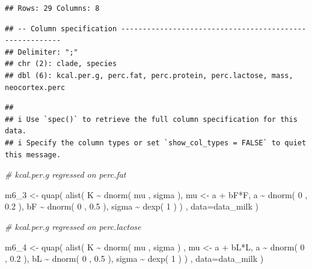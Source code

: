 \documentclass[
]{book}
\newenvironment{Shaded}{\begin{snugshade}}{\end{snugshade}}
\newcommand{\AttributeTok}[1]{\textcolor[rgb]{0.77,0.63,0.00}{#1}}
\newcommand{\CommentTok}[1]{\textcolor[rgb]{0.56,0.35,0.01}{\textit{#1}}}
\newcommand{\DecValTok}[1]{\textcolor[rgb]{0.00,0.00,0.81}{#1}}
\newcommand{\FloatTok}[1]{\textcolor[rgb]{0.00,0.00,0.81}{#1}}
\newcommand{\FunctionTok}[1]{\textcolor[rgb]{0.00,0.00,0.00}{#1}}
\newcommand{\NormalTok}[1]{#1}
\newcommand{\OtherTok}[1]{\textcolor[rgb]{0.56,0.35,0.01}{#1}}
\newcommand{\SpecialCharTok}[1]{\textcolor[rgb]{0.00,0.00,0.00}{#1}}
\begin{document}
\begin{verbatim}
## Rows: 29 Columns: 8
\end{verbatim}

\begin{verbatim}
## -- Column specification --------------------------------------------------------
## Delimiter: ";"
## chr (2): clade, species
## dbl (6): kcal.per.g, perc.fat, perc.protein, perc.lactose, mass, neocortex.perc
\end{verbatim}

\begin{verbatim}
## 
## i Use `spec()` to retrieve the full column specification for this data.
## i Specify the column types or set `show_col_types = FALSE` to quiet this message.
\end{verbatim}

\begin{Shaded}
\begin{Highlighting}[]
\CommentTok{\# kcal.per.g regressed on perc.fat }

\NormalTok{m6\_3 }\OtherTok{\textless{}{-}} \FunctionTok{quap}\NormalTok{(}
  \FunctionTok{alist}\NormalTok{(}
\NormalTok{    K }\SpecialCharTok{\textasciitilde{}} \FunctionTok{dnorm}\NormalTok{( mu , sigma ), }
\NormalTok{    mu }\OtherTok{\textless{}{-}}\NormalTok{ a }\SpecialCharTok{+}\NormalTok{ bF}\SpecialCharTok{*}\NormalTok{F, }
\NormalTok{    a }\SpecialCharTok{\textasciitilde{}} \FunctionTok{dnorm}\NormalTok{( }\DecValTok{0}\NormalTok{ , }\FloatTok{0.2}\NormalTok{ ), }
\NormalTok{    bF }\SpecialCharTok{\textasciitilde{}} \FunctionTok{dnorm}\NormalTok{( }\DecValTok{0}\NormalTok{ , }\FloatTok{0.5}\NormalTok{ ), }
\NormalTok{    sigma }\SpecialCharTok{\textasciitilde{}} \FunctionTok{dexp}\NormalTok{( }\DecValTok{1}\NormalTok{ )}
\NormalTok{) , }\AttributeTok{data=}\NormalTok{data\_milk )}

\CommentTok{\# kcal.per.g regressed on perc.lactose }


\NormalTok{m6\_4 }\OtherTok{\textless{}{-}} \FunctionTok{quap}\NormalTok{( }
  \FunctionTok{alist}\NormalTok{(}
\NormalTok{    K }\SpecialCharTok{\textasciitilde{}} \FunctionTok{dnorm}\NormalTok{( mu , sigma )}
\NormalTok{    , mu }\OtherTok{\textless{}{-}}\NormalTok{ a }\SpecialCharTok{+}\NormalTok{ bL}\SpecialCharTok{*}\NormalTok{L, }
\NormalTok{    a }\SpecialCharTok{\textasciitilde{}} \FunctionTok{dnorm}\NormalTok{( }\DecValTok{0}\NormalTok{ , }\FloatTok{0.2}\NormalTok{ ), }
\NormalTok{    bL }\SpecialCharTok{\textasciitilde{}} \FunctionTok{dnorm}\NormalTok{( }\DecValTok{0}\NormalTok{ , }\FloatTok{0.5}\NormalTok{ ), }
\NormalTok{    sigma }\SpecialCharTok{\textasciitilde{}} \FunctionTok{dexp}\NormalTok{( }\DecValTok{1}\NormalTok{ )}
\NormalTok{) , }\AttributeTok{data=}\NormalTok{data\_milk )}



\end{Highlighting}
\end{Shaded}
\end{document}
